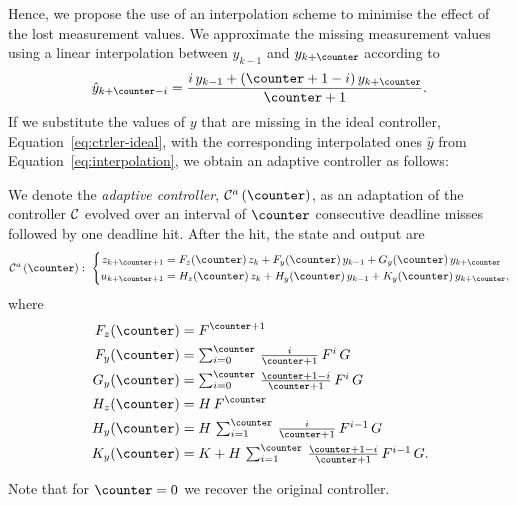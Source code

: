 Hence, we propose the use of an interpolation scheme to minimise the effect of the lost measurement values.
We approximate the missing measurement values using a linear interpolation between $y_{k-1}$ and $y_{k+\counter}$ according to
%
\begin{equation}
    \label{eq:interpolation}
    \hat y_{k+\counter-i} = \frac{i\, y_{k-1} + (\counter+1-i)\, y_{k+\counter}}{\counter+1} .
\end{equation}
%
If we substitute the values of $y$ that are missing in the ideal controller, Equation~\eqref{eq:ctrler-ideal}, with the corresponding interpolated ones $\hat y$ from Equation~\eqref{eq:interpolation}, we obtain an adaptive controller as follows:

\begin{definition}%
    We denote the \emph{adaptive controller}, $\ctrler^a\funof{\counter}$, as an adaptation of the controller $\mathcal{C}$ evolved over an interval of $\counter$ consecutive deadline misses followed by one deadline hit.
    After the hit, the state and output are
    \begin{equation}
        \label{eq:adaptive}
        \ctrler^a\funof{\counter}: \,\,
        \left\{
            \begin{aligned}
                z_{k+\counter+1} &= F_z(\counter)\,z_{k} +  F_y(\counter)\,y_{k-1} + G_y(\counter)\,y_{k+\counter} \\
                u_{k+\counter+1} &= H_z(\counter)\,z_{k} + H_y(\counter)\,y_{k-1} + K_y(\counter)\,y_{k+\counter},
            \end{aligned}\right.
    \end{equation}
    where
    \begin{equation*}
        \begin{aligned}
            \Ac_z(\counter) &= \Ac^{\counter+1} \\
            \Ac_y(\counter) &= \textstyle\sum\nolimits_{i=0}^{\counter}\, \tfrac{i}{\counter+1}\, \Ac^{i}\, \Bc \\
            \Bc_y(\counter) &= \textstyle\sum\nolimits_{i=0}^{\counter}\, \tfrac{\counter+1-i}{\counter+1}\, \Ac^{i}\, \Bc \\
            \Cc_z(\counter) &= \Cc\, \Ac^\counter \\
            \Cc_y(\counter) &= \Cc\, \textstyle\sum\nolimits_{i=1}^{\counter}\, \tfrac{i}{\counter+1}\, \Ac^{i-1}\, \Bc \\
            \Dc_y(\counter) &= \Dc + \Cc\, \textstyle\sum\nolimits_{i=1}^{\counter}\, \tfrac{\counter+1-i}{\counter+1}\, \Ac^{i-1}\, \Bc.
        \end{aligned}
    \end{equation*}
\end{definition}
Note that for $\counter = 0$ we recover the original controller.

